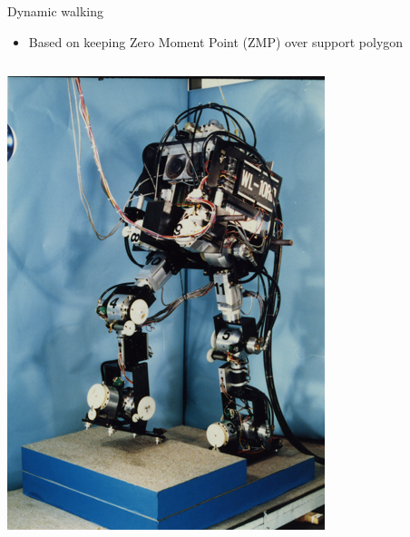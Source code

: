 \documentclass[compress]{beamer}
\begin{document}
\begin{frame}{Dynamic walking}

    \begin{itemize}

        \item Based on keeping Zero Moment Point (ZMP) over support polygon
    \end{itemize}

    \begin{columns}
        \begin{column}{0.5\linewidth}

            \begin{center}
                \includegraphics[width=0.8\linewidth]{image46}


\end{center}
\end{column}
\end{columns}
\end{frame}
\end{document}
